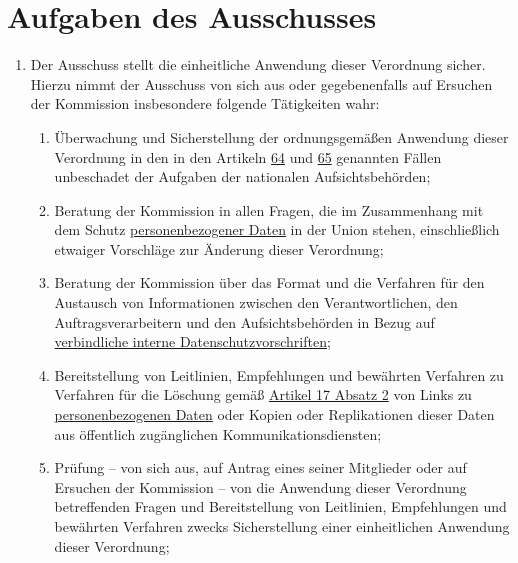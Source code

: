 \chapter{Aufgaben des Ausschusses}
\label{ch:70}


\begin{enumerate}

  \item Der Ausschuss stellt die einheitliche Anwendung dieser Verordnung sicher. Hierzu nimmt der Ausschuss von sich
   aus oder gegebenenfalls auf Ersuchen der Kommission insbesondere folgende Tätigkeiten wahr:
  \label{itm:70-1}

  \begin{enumerate}
  
    \item Überwachung und Sicherstellung der ordnungsgemäßen Anwendung dieser Verordnung in den in den Artikeln
     \hyperref[ch:64]{64} und \hyperref[ch:65]{65} genannten Fällen unbeschadet der Aufgaben der nationalen
      Aufsichtsbehörden;
    \label{itm:70-1a}

    \item Beratung der Kommission in allen Fragen, die im Zusammenhang mit dem Schutz \hyperref[itm:04-1]{personenbezogener Daten} in der
     Union stehen, einschließlich etwaiger Vorschläge zur Änderung dieser Verordnung;
    \label{itm:70-1b}

    \item Beratung der Kommission über das Format und die Verfahren für den Austausch von Informationen zwischen den
     Verantwortlichen, den Auftragsverarbeitern und den Aufsichtsbehörden in Bezug auf \hyperref[itm:04-20]{verbindliche interne
     Datenschutzvorschriften};
    \label{itm:70-1c}

    \item Bereitstellung von Leitlinien, Empfehlungen und bewährten Verfahren zu Verfahren für die Löschung gemäß
     \hyperref[itm:17-2]{Artikel 17 Absatz 2} von Links zu \hyperref[itm:04-1]{personenbezogenen Daten} oder Kopien oder Replikationen dieser
     Daten aus öffentlich zugänglichen Kommunikationsdiensten;
    \label{itm:70-1d}

    \item Prüfung -- von sich aus, auf Antrag eines seiner Mitglieder oder auf Ersuchen der Kommission -- von die
     Anwendung dieser Verordnung betreffenden Fragen und Bereitstellung von Leitlinien, Empfehlungen und bewährten
     Verfahren zwecks Sicherstellung einer einheitlichen Anwendung dieser Verordnung;
    \label{itm:70-1e}


\end{enumerate}
\end{enumerate}
